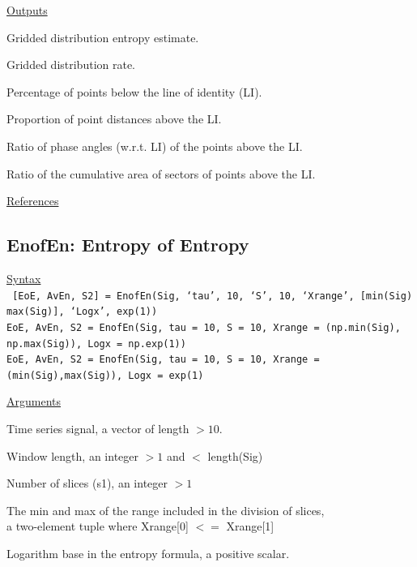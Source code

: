 \documentclass[12pt, a4paper, titlepage, openany]{book}
\begin{document}
\noindent \ul{Outputs}
\begin{description}[labelsep=1cm, labelwidth=2cm, nosep, style=multiline,leftmargin=3cm]\footnotesize
\item[\texttt{GDE}]	Gridded distribution entropy estimate.
\item[\texttt{GDR}]	Gridded distribution rate.
\item[\texttt{PIx}]	Percentage of points below the line of identity (LI). \cite{Grid3}
\item[\texttt{GIx}]	Proportion of point distances above the LI. \cite{Grid5}
\item[\texttt{SIx}]	Ratio of phase angles (w.r.t. LI) of the points above the LI.\cite{Grid4} 
\item[\texttt{AIx}]	Ratio of the cumulative area of sectors of points above the LI.\cite{Grid2}
\end{description}

\noindent \ul{References}\hspace{1cm}
\cite{Grid1} \cite{Grid2} \cite{Grid3} \cite{Grid4} \cite{Grid5}



\newpage
\subsection{\normalsize EnofEn: \hspace{15mm} Entropy of Entropy} \label{EnofEn}
\noindent\ul{Syntax} \vspace{6mm} \\ \noindent \texttt{\footnotesize
[EoE, AvEn, S2]  = EnofEn(Sig, ‘tau’, 10, ‘S’, 10, ‘Xrange’, [min(Sig) max(Sig)], ‘Logx’, exp(1)) \\
EoE, AvEn, S2 = EnofEn(Sig, tau = 10, S = 10, Xrange = (np.min(Sig), np.max(Sig)), Logx = np.exp(1)) \\
EoE, AvEn, S2 = EnofEn(Sig, tau = 10, S = 10, Xrange = (min(Sig),max(Sig)), Logx = exp(1)}

\noindent \ul{Arguments}
\begin{description}[labelsep=1cm, labelwidth=2cm, nosep, style=multiline,leftmargin=3cm]\footnotesize
\item[\texttt{Sig}]		Time series signal, a vector of length $> 10$.
\item[\texttt{tau}]		Window length, an integer $> 1$ and $<$ length(Sig)
\item[\texttt{S}]		Number of slices (s1), an integer $> 1$
\item[\texttt{Xrange}]	The min and max of the range included in the division of slices, \\
						a two-element tuple where Xrange[0] $<=$ Xrange[1]
\item[\texttt{Logx}]	Logarithm base in the entropy formula, a positive scalar.
\end{description}
\end{document}
